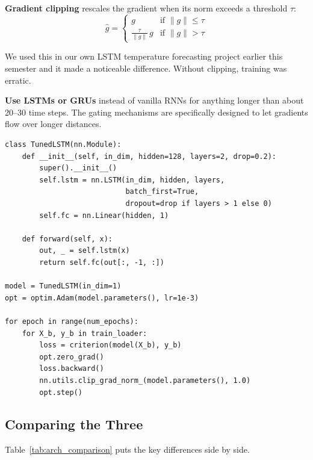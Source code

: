 \documentclass[12pt, letterpaper]{article}
\begin{document}
\textbf{Gradient clipping} rescales the gradient when its norm exceeds a threshold $\tau$:
\begin{equation}
    \hat{g} = \begin{cases}
        g & \text{if } \|g\| \leq \tau \\[4pt]
        \frac{\tau}{\|g\|}\, g & \text{if } \|g\| > \tau
    \end{cases}
\end{equation}

We used this in our own LSTM temperature forecasting project earlier this semester and it made a noticeable difference. Without clipping, training was erratic.

\textbf{Use LSTMs or GRUs} instead of vanilla RNNs for anything longer than about 20--30 time steps. The gating mechanisms are specifically designed to let gradients flow over longer distances.

\noindent\begin{minipage}{\linewidth}
\begin{lstlisting}[caption={LSTM training with gradient clipping}]
class TunedLSTM(nn.Module):
    def __init__(self, in_dim, hidden=128, layers=2, drop=0.2):
        super().__init__()
        self.lstm = nn.LSTM(in_dim, hidden, layers,
                            batch_first=True,
                            dropout=drop if layers > 1 else 0)
        self.fc = nn.Linear(hidden, 1)

    def forward(self, x):
        out, _ = self.lstm(x)
        return self.fc(out[:, -1, :])

model = TunedLSTM(in_dim=1)
opt = optim.Adam(model.parameters(), lr=1e-3)

for epoch in range(num_epochs):
    for X_b, y_b in train_loader:
        loss = criterion(model(X_b), y_b)
        opt.zero_grad()
        loss.backward()
        nn.utils.clip_grad_norm_(model.parameters(), 1.0)
        opt.step()
\end{lstlisting}
\end{minipage}

\subsection{Comparing the Three}

Table~\ref{tab:arch_comparison} puts the key differences side by side.
\end{document}
